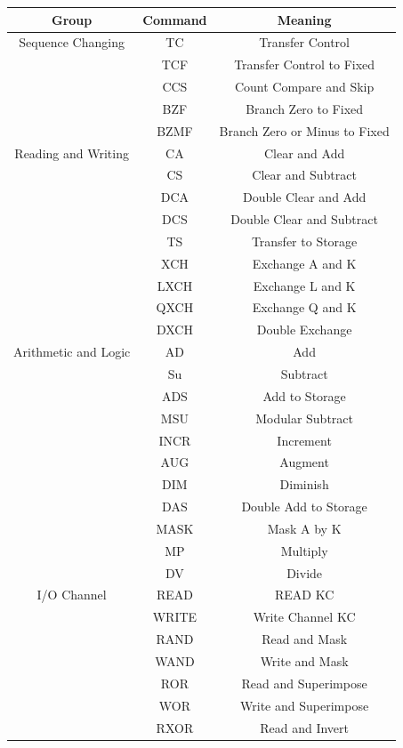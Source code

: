 \documentclass[a4paper,11pt]{article}
\begin{document}
\begin{center}
\begin{tabular}{| c | c | c |}
  \hline	
  	Group & Command & Meaning \\ \hline \hline
	Sequence Changing & TC & Transfer Control \\ \hline
	& TCF & Transfer Control to Fixed \\ \hline
	& CCS & Count Compare and Skip \\ \hline
	& BZF & Branch Zero to Fixed \\ \hline
	& BZMF & Branch Zero or Minus to Fixed \\ \hline
	
	Reading and Writing & CA & Clear and Add \\ \hline
	& CS & Clear and Subtract \\ \hline
	& DCA & Double Clear and Add \\ \hline
	& DCS & Double Clear and Subtract \\ \hline
	& TS & Transfer to Storage \\ \hline
	& XCH & Exchange A and K \\ \hline
	& LXCH & Exchange L and K \\ \hline
	& QXCH & Exchange Q and K \\ \hline
	& DXCH & Double Exchange \\ \hline
	
	Arithmetic and Logic & AD & Add \\ \hline
	& Su & Subtract \\ \hline
	& ADS & Add to Storage \\ \hline
	& MSU & Modular Subtract \\ \hline
	& INCR & Increment \\ \hline
	& AUG & Augment \\ \hline
	& DIM & Diminish \\ \hline
	& DAS & Double Add to Storage \\ \hline
	& MASK & Mask A by K \\ \hline
	& MP & Multiply \\ \hline
	& DV & Divide \\ \hline

	I/O Channel & READ & READ KC \\ \hline
	& WRITE & Write Channel KC \\ \hline
	& RAND & Read and Mask \\ \hline
	& WAND & Write and Mask \\ \hline
	& ROR & Read and Superimpose \\ \hline
	& WOR & Write and Superimpose \\ \hline
	& RXOR & Read and Invert \\ \hline
	
\end{tabular} \\
\end{center}
\end{document}
